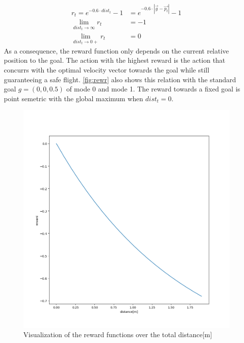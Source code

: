 \begin{align}
	r_t = e^{-0.6 \cdot dist_t} - 1 &= e^{-0.6 \cdot |\overrightarrow{g} - \overrightarrow{p_t}|} - 1 \label{eq:rew}\\
	\lim_{dist_t \to \infty} r_t &= -1\\
	\lim_{dist_t \to 0+} r_t &= 0
\end{align}
As a consequence, the reward function only depends on the current relative position to the goal. The action with the highest reward is the action that concurrs with the optimal velocity vector towards the goal while still guaranteeing a safe flight. \cref{fig:rewr} also shows this relation with the standard goal $g=(0, 0, 0.5)$ of mode 0 and mode 1. The reward towards a fixed goal is point semetric with the global maximum when $dist_t = 0$.

\newpage

\begin{figure}
	\centering
	\includegraphics[width= 0.5\linewidth]{figures/reward.png}
	\caption{Visualization of the reward functions over the total distance[m]}
	\label{fig:rewd}
\end{figure}

